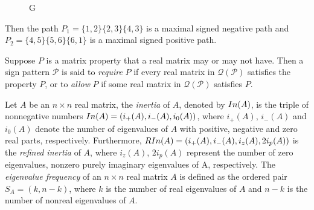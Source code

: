\documentclass[10pt,a4paper]{amsart}
\numberwithin{equation}{section}
\def\In{{\rm In}}
\def\RIn{{\rm RIn}}
\begin{document}
	\begin{figure}[H] \label{nfig11}
		\tikzset{node distance=1cm}
		\centering
		 \caption{G}\end{figure}
	Then the path $P_1=\{1,2\}\{2,3\}\{4,3\}$ is a maximal signed negative path and $P_2=\{4,5\}\{5,6\}\{6,1\}$ is a maximal signed positive path.
	
	Suppose $P$ is a matrix property that a real matrix may or may not have. Then a sign pattern $\mathcal{P}$ is said to \textit{require} $P$ if every real matrix in $\mathcal{Q}(\mathcal{P})$ satisfies the property $P$, or to \textit{allow} $P$ if some real matrix in $\mathcal{Q}(\mathcal{P})$ satisfies $P$.
	
	
	
	Let $A$ be an $n\times n$ real matrix, the \textit{inertia} of $A$,  denoted by $\In(A)$, is the triple of nonnegative numbers $\In(A)=(i_+(A), i_-(A),i_0(A))$, where $i_+(A)$, $i_-(A)$ and $i_0(A)$ denote the number of eigenvalues of $A$ with positive, negative and zero real parts, respectively. Furthermore, $\RIn(A) = (i_+(A), i_-(A), i_z(A), 2i_{p}(A))$ is the \textit{refined inertia} of $A$, where $i_z(A)$, $2i_{p}(A)$ represent the number of zero eigenvalues, nonzero purely imaginary eigenvalues of A, respectively. The \textit{eigenvalue frequency} of an $n\times n$ real matrix $A$ is defined as the ordered pair $S_A=(k,n-k)$, where $k$ is the number of real eigenvalues of $A$ and $n-k$ is the number of nonreal eigenvalues of $A$. 
	
\end{document}
